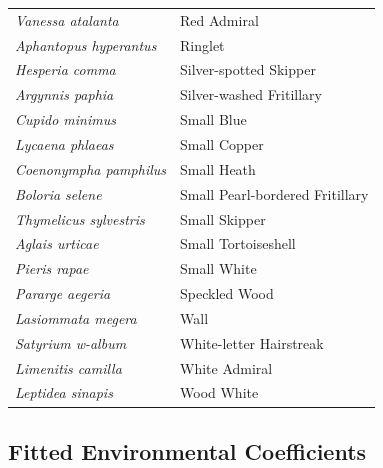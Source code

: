 \documentclass[
]{article}
\begin{document}
\begin{longtable}[]{@{}ll@{}}
\textit{Vanessa atalanta} & Red Admiral \\
\textit{Aphantopus hyperantus} & Ringlet \\
\textit{Hesperia comma} & Silver-spotted Skipper \\
\textit{Argynnis paphia} & Silver-washed Fritillary \\
\textit{Cupido minimus} & Small Blue \\
\textit{Lycaena phlaeas} & Small Copper \\
\textit{Coenonympha pamphilus} & Small Heath \\
\textit{Boloria selene} & Small Pearl-bordered Fritillary \\
\textit{Thymelicus sylvestris} & Small Skipper \\
\textit{Aglais urticae} & Small Tortoiseshell \\
\textit{Pieris rapae} & Small White \\
\textit{Pararge aegeria} & Speckled Wood \\
\textit{Lasiommata megera} & Wall \\
\textit{Satyrium w-album} & White-letter Hairstreak \\
\textit{Limenitis camilla} & White Admiral \\
\textit{Leptidea sinapis} & Wood White \\
\bottomrule
\end{longtable}

\hypertarget{fitted-environmental-coefficients}{%
\subsection{Fitted Environmental
Coefficients}\label{fitted-environmental-coefficients}}
\end{document}
